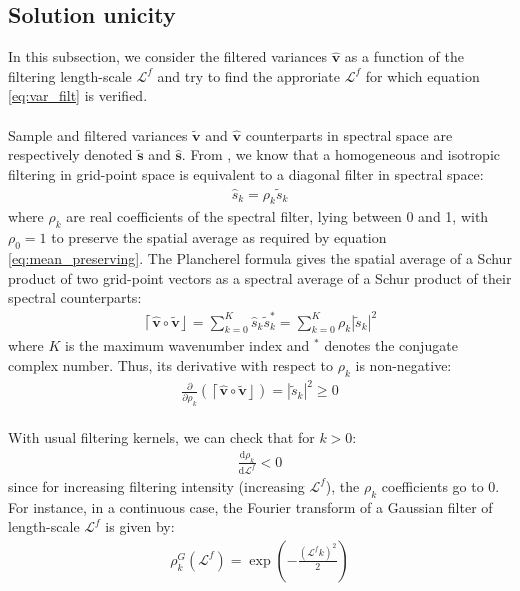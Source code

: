 \documentclass[12pt]{scrartcl}
\begin{document}
\subsection{Solution unicity}
In this subsection, we consider the filtered variances $\widehat{\mathbf{v}}$ as a function of the filtering length-scale $\mathcal{L}^f$ and try to find the approriate $\mathcal{L}^f$ for which equation \eqref{eq:var_filt} is verified.\\
$  $\\
Sample and filtered variances $\widetilde{\mathbf{v}}$ and $\widehat{\mathbf{v}}$ counterparts in spectral space are respectively denoted $\widetilde{\mathbf{s}}$ and $\widehat{\mathbf{s}}$. From \citet{berre_2000}, we know that a homogeneous and isotropic filtering in grid-point space is equivalent to a diagonal filter in spectral space:
\begin{align}
\widehat{s}_k = \rho_k \widetilde{s}_k
\end{align}
where $\rho_k$ are real coefficients of the spectral filter, lying between 0 and 1, with $\rho_0 = 1$ to preserve the spatial average as required by equation \eqref{eq:mean_preserving}. The Plancherel formula gives the spatial average of a Schur product of two grid-point vectors as a spectral average of a Schur product of their spectral counterparts:
\begin{align}
\left\lceil\widehat{\mathbf{v}} \circ \widetilde{\mathbf{v}}\right\rfloor = \sum_{k=0}^K \widehat{s}_k \widetilde{s}_k^*  = \sum_{k=0}^K \rho_k \left\vert \widetilde{s}_k \right\vert^2
\end{align}
where $K$ is the maximum wavenumber index and $^*$ denotes the conjugate complex number. Thus, its derivative with respect to $\rho_k$ is non-negative:
\begin{align}
\frac{\partial}{\partial \rho_k} \left(\left\lceil\widehat{\mathbf{v}} \circ \widetilde{\mathbf{v}}\right\rfloor\right) = \left\vert \widetilde{s}_k \right\vert^2 \ge 0
\end{align}
$  $\\
With usual filtering kernels, we can check that for $k > 0$:
\begin{align}
\frac{\mathrm{d} \rho_k}{\mathrm{d} \mathcal{L}^f} < 0
\end{align}
since for increasing filtering intensity (increasing $\mathcal{L}^f$), the $\rho_k$ coefficients go to 0. For instance, in a continuous case, the Fourier transform of a Gaussian filter of length-scale $\mathcal{L}^f$ is given by:
\begin{align}
\rho^G_k \left(\mathcal{L}^f\right) = \exp\left(-\frac{\left(\mathcal{L}^f k\right)^2}{2}\right)
\end{align}
\end{document}
